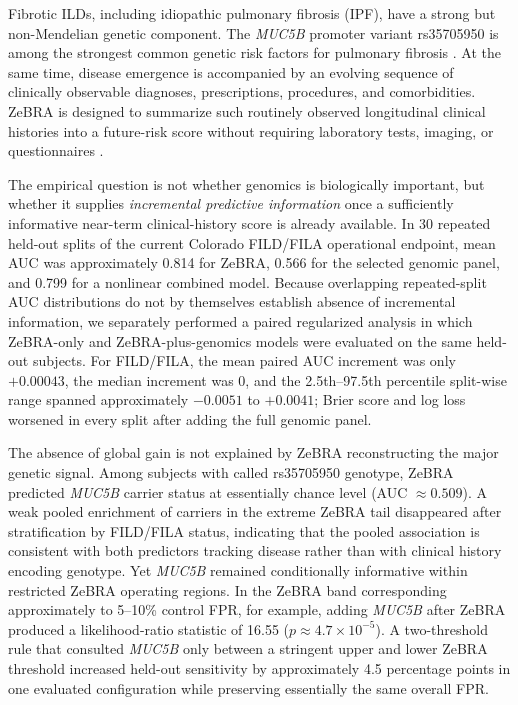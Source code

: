 \documentclass[journal]{IEEEtran}
\begin{document}
Fibrotic ILDs, including idiopathic pulmonary fibrosis (IPF), have a strong but non-Mendelian genetic component. The \textit{MUC5B} promoter variant rs35705950 is among the strongest common genetic risk factors for pulmonary fibrosis \cite{Seibold2011,Fingerlin2013,Allen2020}. At the same time, disease emergence is accompanied by an evolving sequence of clinically observable diagnoses, prescriptions, procedures, and comorbidities. ZeBRA is designed to summarize such routinely observed longitudinal clinical histories into a future-risk score without requiring laboratory tests, imaging, or questionnaires \cite{Onishchenko2026}.

The empirical question is not whether genomics is biologically important, but whether it supplies \emph{incremental predictive information} once a sufficiently informative near-term clinical-history score is already available. In 30 repeated held-out splits of the current Colorado FILD/FILA operational endpoint, mean AUC was approximately 0.814 for ZeBRA, 0.566 for the selected genomic panel, and 0.799 for a nonlinear combined model. Because overlapping repeated-split AUC distributions do not by themselves establish absence of incremental information, we separately performed a paired regularized analysis in which ZeBRA-only and ZeBRA-plus-genomics models were evaluated on the same held-out subjects. For FILD/FILA, the mean paired AUC increment was only $+0.00043$, the median increment was 0, and the 2.5th--97.5th percentile split-wise range spanned approximately $-0.0051$ to $+0.0041$; Brier score and log loss worsened in every split after adding the full genomic panel.

The absence of global gain is not explained by ZeBRA reconstructing the major genetic signal. Among subjects with called rs35705950 genotype, ZeBRA predicted \textit{MUC5B} carrier status at essentially chance level (AUC $\approx0.509$). A weak pooled enrichment of carriers in the extreme ZeBRA tail disappeared after stratification by FILD/FILA status, indicating that the pooled association is consistent with both predictors tracking disease rather than with clinical history encoding genotype. Yet \textit{MUC5B} remained conditionally informative within restricted ZeBRA operating regions. In the ZeBRA band corresponding approximately to 5--10\% control FPR, for example, adding \textit{MUC5B} after ZeBRA produced a likelihood-ratio statistic of 16.55 ($p\approx4.7\times10^{-5}$). A two-threshold rule that consulted \textit{MUC5B} only between a stringent upper and lower ZeBRA threshold increased held-out sensitivity by approximately 4.5 percentage points in one evaluated configuration while preserving essentially the same overall FPR.
\end{document}
